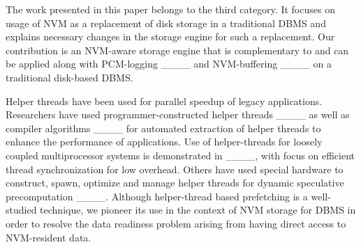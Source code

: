 The work presented in this paper belongs to the third category. It focuses on usage of NVM as a replacement of disk storage in a traditional DBMS and explains necessary changes in the storage engine for such a replacement. Our contribution is an NVM-aware storage engine that is complementary to and can be applied along with PCM-logging ____ and NVM-buffering ____ on a traditional disk-based DBMS.





Helper threads have been used for parallel speedup of legacy applications.  Researchers have used programmer-constructed helper threads ____ as well as compiler algorithms ____ for automated extraction of helper threads to enhance the performance of applications. Use of helper-threads for loosely coupled multiprocessor systems is demonstrated in ____, with focus on efficient thread synchronization for low overhead. Others have used special hardware to construct, spawn, optimize and manage helper threads for dynamic speculative precomputation ____. Although helper-thread based prefetching is a well-studied technique, we pioneer its use in the context of NVM storage for DBMS in order to resolve the data readiness problem arising from having direct access to NVM-resident data.